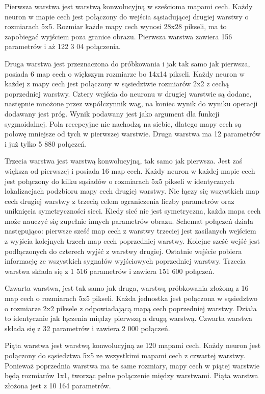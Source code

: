 \documentclass[12pt,a4paper,twoside,titlepage,openright]{book}
\begin{document}
Pierwsza warstwa jest warstwą konwolucyjną w sześcioma mapami cech. Każdy neuron w mapie cech jest połączony do wejścia sąsiadującej drugiej warstwy o rozmiarach 5x5. Rozmiar każde mapy cech wynosi 28x28 pikseli, ma to zapobiegać wyjściem poza granice obrazu. Pierwsza warstwa zawiera 156 parametrów i aż 122 3 04 połączenia.

Druga warstwa jest przeznaczona do próbkowania i jak tak samo jak pierwsza, posiada 6 map cech o większym rozmiarze bo 14x14 pikseli. Każdy neuron w każdej z mapy cech jest połączony w sąsiedztwie rozmiarów 2x2 z cechą poprzedniej warstwy. Cztery wejścia do neuronu w drugiej warstwie są dodane, następnie mnożone przez współczynnik wag, na koniec wynik do wyniku operacji dodawany jest próg. Wynik podawany jest jako argument dla funkcji sygmoidalnej. Pola recepcyjne nie nachodzą na siebie, dlatego mapy cech są połowę mniejsze od tych w pierwszej warstwie. Druga warstwa ma 12 parametrów i już tylko 5 880 połączeń.

Trzecia warstwa jest warstwą konwolucyjną, tak samo jak pierwsza. Jest zaś większa od pierwszej i posiada 16 map cech. Każdy neuron w każdej mapie cech jest połączony do kilku sąsiadów o rozmiarach 5x5 pikseli w identycznych lokalizacjach podzbioru mapy cech drugiej warstwy. Nie łączy się wszystkich map cech drugiej warstwy z trzecią celem ograniczenia liczby parametrów oraz uniknięcia symetryczności sieci. Kiedy sieć nie jest symetryczna, każda mapa cech może nauczyć się zupełnie innych parametrów obrazu. Schemat połączeń działa następująco: pierwsze sześć map cech z warstwy trzeciej jest zasilanych wejściem z wyjścia kolejnych trzech map cech poprzedniej warstwy. Kolejne sześć wejść jest podłączonych do czterech wyjść z warstwy drugiej. Ostatnie wejście pobiera informację ze wszystkich sygnałów wyjściowych poprzedniej warstwy. Trzecia warstwa składa się z 1 516 parametrów i zawiera 151 600 połączeń.

Czwarta warstwa, jest tak samo jak druga, warstwą próbkowania złożoną z 16 map cech o rozmiarach 5x5 pikseli. Każda jednostka jest połączona w sąsiedztwo o rozmiarze 2x2 piksele z odpowiadającą mapą cech poprzedniej warstwy. Działa to identycznie jak łączenia między pierwszą a drugą warstwą. Czwarta warstwa składa się z 32 parametrów i zawiera 2 000 połączeń.

Piąta warstwa jest warstwą konwolucyjną ze 120 mapami cech. Każdy neuron jest połączony do sąsiedztwa 5x5 ze wszystkimi mapami cech z czwartej warstwy. Ponieważ poprzednia warstwa ma te same rozmiary, mapy cech w piątej warstwie będą rozmiarów 1x1, tworząc pełne połączenie między warstwami. Piąta warstwa złożona jest z 10 164 parametrów.
\end{document}
